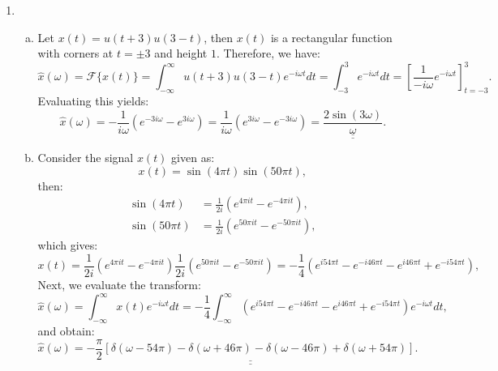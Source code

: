\begin{enumerate}
  \item
        \begin{enumerate}[a)]
          \item Let $x(t)=u(t+3)u(3-t)$, then $x(t)$ is a rectangular function with corners at $t=\pm 3$ and height $1$. Therefore, we have:
                \[ \hat{x}(\omega)=\mathcal{F}\{x(t)\}=\int_{-\infty}^{\infty}u(t+3)u(3-t)e^{-i\omega t}dt=\int_{-3}^{3}e^{-i\omega t}dt=\left[\frac{1}{-i\omega}e^{-i\omega t}\right]_{t=-3}^{3}. \]
                Evaluating this yields:
                \[ \hat{x}(\omega)=-\frac{1}{i\omega}(e^{-3i\omega}-e^{3i\omega})=\frac{1}{i\omega}(e^{3i\omega}-e^{-3i\omega})=\underline{\underline{\frac{2\sin(3\omega)}{\omega}}}. \]

          \item Consider the signal $x(t)$ given as:
                \[ x(t)=\sin(4\pi t)\sin(50\pi t), \]
                then:
                \begin{align*}
                  \sin(4\pi t)  & =\frac{1}{2i}(e^{4\pi i t}-e^{-4\pi it}),  \\
                  \sin(50\pi t) & =\frac{1}{2i}(e^{50\pi it}-e^{-50\pi it}),
                \end{align*}
                which gives:
                \[ x(t)=\frac{1}{2i}\left(e^{4\pi it}-e^{-4\pi it}\right)\frac{1}{2i}\left(e^{50\pi it}-e^{-50\pi it}\right)=-\frac{1}{4}\left(e^{i54\pi t}-e^{-i46\pi t}-e^{i46\pi t}+e^{-i54\pi t}\right), \]
                Next, we evaluate the transform:
                \[ \hat{x}(\omega)=\int_{-\infty}^{\infty}x(t)e^{-i\omega t}dt=-\frac{1}{4}\int_{-\infty}^{\infty}\left(e^{i54\pi t}-e^{-i46\pi t}-e^{i46\pi t}+e^{-i54\pi t}\right)e^{-i\omega t}dt, \]
                and obtain:
                \[ \hat{x}(\omega)=\underline{\underline{-\frac{\pi}{2}[\delta(\omega-54\pi)-\delta(\omega+46\pi)-\delta(\omega-46\pi)+\delta(\omega+54\pi)]}}. \]


\end{enumerate}
\end{enumerate}
